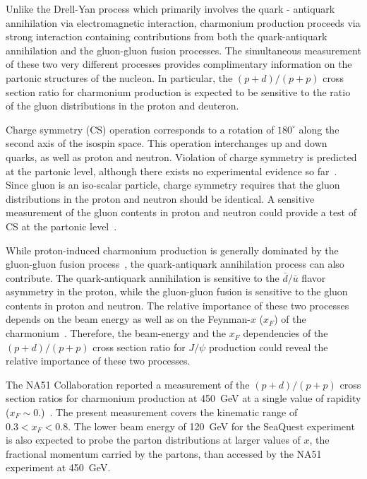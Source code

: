 \documentclass[reprint,aps,unsortedaddress,superscriptaddress,prd,floatfix,showpacs,linenumbers]{revtex4-2}
\begin{document}
Unlike the Drell-Yan process which primarily involves the  
quark - antiquark annihilation via electromagnetic interaction, charmonium
production proceeds via strong interaction containing contributions from
both the quark-antiquark annihilation and the gluon-gluon
fusion processes. The simultaneous measurement of these two very different
processes provides complimentary
information on the partonic structures of the nucleon. In particular,
the $(p+d) / (p+p)$ cross section ratio for charmonium production is expected
to be sensitive to the ratio of the gluon distributions in the proton 
and deuteron.

Charge symmetry (CS) operation corresponds to  
a rotation of $180^\circ$ along the second axis of the 
isospin space. This operation interchanges up and down quarks, as well
as proton and neutron. 
Violation of charge symmetry is predicted at the
partonic level, although there exists no experimental evidence
so far~\cite{londergan2010}. Since gluon is an iso-scalar particle, charge symmetry
requires that the gluon distributions in the proton and neutron
should be identical. A sensitive measurement of the
gluon contents in proton and neutron could provide a test of CS at
the partonic level~\cite{piller1996,zhu2008,lansberg2012}.
 
While proton-induced charmonium production is generally dominated
by the gluon-gluon fusion process~\cite{vogt1999}, the
quark-antiquark annihilation process can also contribute. 
The quark-antiquark annihilation is sensitive to the
$\bar{d} / \bar{u}$ flavor asymmetry in the proton, while the
gluon-gluon fusion is sensitive to the gluon contents in proton and
neutron. The relative importance of these two
processes depends on the beam energy as well as on the 
Feynman-$x$ ($x_F$) of the charmonium~\cite{peng1995}. Therefore, the 
beam-energy and the $x_F$ dependencies
of the $(p+d) / (p+p)$ cross section ratio for $J/\psi$ production 
could reveal the relative importance of these two processes.

The NA51 Collaboration reported a measurement of the $(p+d) / (p+p)$ cross 
section ratios for charmonium production at \SI{450}{\GeV} at a single value of
rapidity ($x_F \sim 0.$)~\cite{abreu1998}. The present measurement covers the 
kinematic range of $0.3 < x_F < 0.8$. The lower beam energy of \SI{120}{\GeV}
for the SeaQuest experiment is also expected to probe
the parton distributions at larger values of $x$, the fractional momentum
carried by the partons, than accessed by the NA51 experiment at \SI{450}{\GeV}.
\end{document}
